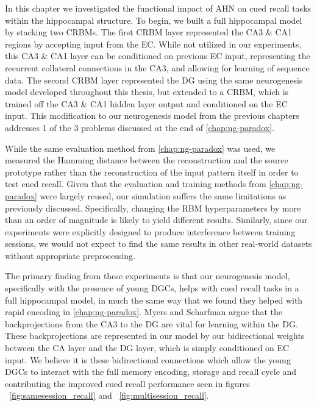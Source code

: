 In this chapter we investigated the functional impact of \ac{AHN}  
on cued recall tasks within the hippocampal structure. 
To begin, we built a full hippocampal model by stacking two \acp{CRBM}. 
The first \ac{CRBM} layer represented the CA3 \& CA1 regions by accepting 
input from the \ac{EC}.
While not utilized in our experiments, this CA3 \& CA1 layer can be conditioned on 
previous \ac{EC} input, representing the recurrent collateral connections in the CA3, 
and allowing for learning of sequence data.
The second \ac{CRBM} layer represented the \ac{DG} using the same neurogenesis 
model developed throughout this thesis, but extended to a \ac{CRBM}, which is
trained off the CA3 \& CA1 hidden layer output 
and conditioned on the \ac{EC} input. 
This modification to our neurogenesis model from the previous 
chapters addresses 1 of the 3 problems discussed at the end of \cref{chap:ng-paradox}.

While the same evaluation method from \cref{chap:ng-paradox} was used, we 
measured the Hamming distance between the reconstruction and the 
source prototype rather than the reconstruction of the input pattern itself 
in order to test cued recall.
Given that the evaluation and training methods from \cref{chap:ng-paradox} 
were largely reused, our simulation suffers the same limitations as previously discussed.
Specifically, changing the \ac{RBM} hyperparameters by 
more than an order of magnitude is likely to yield different results.
Similarly, since our experiments were explicitly designed to produce interference between 
training sessions, we would not expect to find the same results in other real-world datasets 
without appropriate preprocessing.

The primary finding from these experiments is that our neurogenesis model, 
specifically with the presence of young \acp{DGC}, helps with cued recall tasks 
in a full hippocampal model, in much the same way that we 
found they helped with rapid encoding in \cref{chap:ng-paradox}. 
Myers and Scharfman \citeyearpar{CA3_DG_backprojections} argue 
that the backprojections from the CA3 to the \ac{DG} are vital for 
learning within the \ac{DG}.
These backprojections are represented in our model by our bidirectional weights 
between the CA layer and the \ac{DG} layer, which is simply conditioned 
on \ac{EC} input. 
We believe it is these bidirectional connections which allow the young 
\acp{DGC} to interact with the full memory encoding, storage and recall cycle 
and contributing the improved cued recall performance seen in 
figures ~\ref{fig:samesession_recall} and ~\ref{fig:multisession_recall}.

